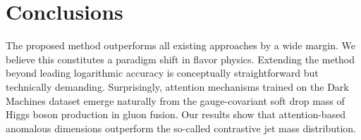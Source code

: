 \section{Conclusions}\label{sec:conclusions}

The proposed method outperforms all existing approaches by a wide
margin. We believe this constitutes a paradigm shift in flavor physics.
Extending the method beyond leading logarithmic accuracy is conceptually
straightforward but technically demanding. Surprisingly, attention
mechanisms trained on the Dark Machines dataset emerge naturally from
the gauge-covariant soft drop mass of Higgs boson production in gluon
fusion. Our results show that attention-based anomalous dimensions
outperform the so-called contrastive jet mass distribution.

